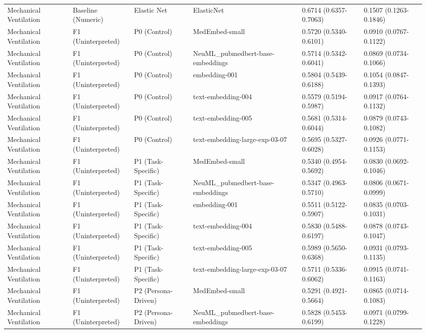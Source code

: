 \begin{tabular}{llllll}
Mechanical Ventilation & Baseline (Numeric) & Elastic Net & ElasticNet & 0.6714 (0.6357-0.7063) & 0.1507 (0.1263-0.1846) \\
Mechanical Ventilation & F1 (Uninterpreted) & P0 (Control) & MedEmbed-small & 0.5720 (0.5340-0.6101) & 0.0910 (0.0767-0.1122) \\
Mechanical Ventilation & F1 (Uninterpreted) & P0 (Control) & NeuML\_pubmedbert-base-embeddings & 0.5714 (0.5342-0.6041) & 0.0869 (0.0734-0.1066) \\
Mechanical Ventilation & F1 (Uninterpreted) & P0 (Control) & embedding-001 & 0.5804 (0.5439-0.6188) & 0.1054 (0.0847-0.1393) \\
Mechanical Ventilation & F1 (Uninterpreted) & P0 (Control) & text-embedding-004 & 0.5579 (0.5194-0.5987) & 0.0917 (0.0764-0.1132) \\
Mechanical Ventilation & F1 (Uninterpreted) & P0 (Control) & text-embedding-005 & 0.5681 (0.5314-0.6044) & 0.0879 (0.0743-0.1082) \\
Mechanical Ventilation & F1 (Uninterpreted) & P0 (Control) & text-embedding-large-exp-03-07 & 0.5695 (0.5327-0.6028) & 0.0926 (0.0771-0.1153) \\
Mechanical Ventilation & F1 (Uninterpreted) & P1 (Task-Specific) & MedEmbed-small & 0.5340 (0.4954-0.5692) & 0.0830 (0.0692-0.1046) \\
Mechanical Ventilation & F1 (Uninterpreted) & P1 (Task-Specific) & NeuML\_pubmedbert-base-embeddings & 0.5347 (0.4963-0.5710) & 0.0806 (0.0671-0.0999) \\
Mechanical Ventilation & F1 (Uninterpreted) & P1 (Task-Specific) & embedding-001 & 0.5511 (0.5122-0.5907) & 0.0835 (0.0703-0.1031) \\
Mechanical Ventilation & F1 (Uninterpreted) & P1 (Task-Specific) & text-embedding-004 & 0.5830 (0.5488-0.6197) & 0.0878 (0.0743-0.1047) \\
Mechanical Ventilation & F1 (Uninterpreted) & P1 (Task-Specific) & text-embedding-005 & 0.5989 (0.5650-0.6368) & 0.0931 (0.0793-0.1135) \\
Mechanical Ventilation & F1 (Uninterpreted) & P1 (Task-Specific) & text-embedding-large-exp-03-07 & 0.5711 (0.5336-0.6062) & 0.0915 (0.0741-0.1163) \\
Mechanical Ventilation & F1 (Uninterpreted) & P2 (Persona-Driven) & MedEmbed-small & 0.5291 (0.4921-0.5664) & 0.0865 (0.0714-0.1083) \\
Mechanical Ventilation & F1 (Uninterpreted) & P2 (Persona-Driven) & NeuML\_pubmedbert-base-embeddings & 0.5828 (0.5453-0.6199) & 0.0971 (0.0799-0.1228) \\

\end{tabular}
